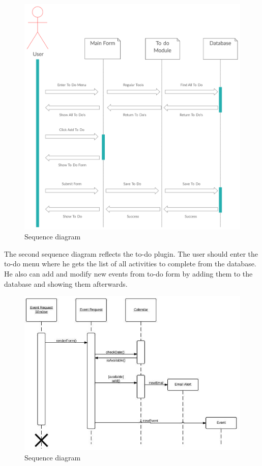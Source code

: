 \begin{figure}[h]
	\includegraphics[width=\textwidth]{secuence digrram2}
	\caption{Sequence diagram}
\end{figure}
\par The second sequence diagram reflects the to-do plugin. The user should enter the to-do menu where he gets the list of all activities to complete from the database. He also can add and modify new events  from to-do form by adding them to the database and showing them afterwards.
\par 
\begin{figure}[h]
	\includegraphics[width=\textwidth]{Sequence_Diagram3}
	\caption{Sequence diagram}	
\end{figure}
